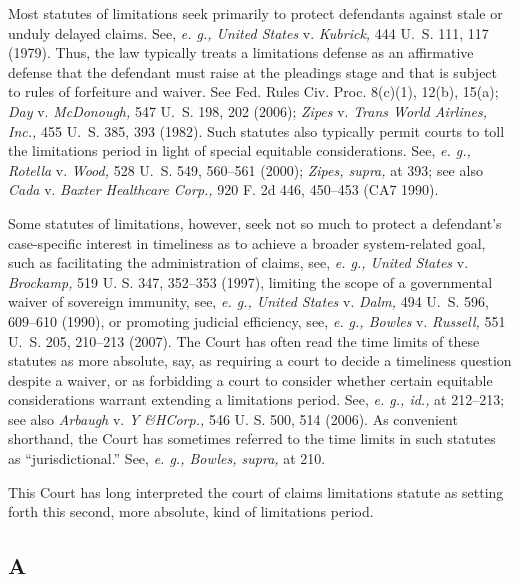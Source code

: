   Most statutes of limitations seek primarily to protect defendants against stale or unduly delayed claims. See, \emph{e. g., United States} v. \emph{Kubrick,} 444 U.~S. 111, 117 (1979). Thus, the law typically treats a limitations defense as an affirmative defense that the defendant must raise at the pleadings stage and that is subject to rules of forfeiture and waiver. See Fed. Rules Civ. Proc. 8(c)(1), 12(b), 15(a); \emph{Day} v. \emph{McDonough,} 547 U.~S. 198, 202 (2006); \emph{Zipes} v. \emph{Trans World Airlines, Inc.,} 455 U.~S. 385, 393 (1982). Such statutes also typically permit courts to toll the limitations period in light of special equitable considerations. See, \emph{e. g., Rotella} v. \emph{Wood,} 528 U.~S. 549, 560--561 (2000); \emph{Zipes, supra,} at 393; see also \emph{Cada} v. \emph{Baxter Healthcare Corp.,} 920 F. 2d 446, 450--453 (CA7 1990).

  Some statutes of limitations, however, seek not so much to protect a defendant's case-specific interest in timeliness as to achieve a broader system-related goal, such as facilitating the administration of claims, see, \emph{e. g., United States} v. \emph{Brockamp,} 519 U. S. 347, 352--353 (1997), limiting the scope of a governmental waiver of sovereign immunity, see, \emph{e. g., United States} v. \emph{Dalm,} 494 U.~S. 596, 609--610 (1990), or promoting judicial efficiency, see, \emph{e. g., Bowles} v. \emph{Russell,} 551 U.~S. 205, 210--213 (2007). The Court has often read the time limits of these statutes as more absolute, say, as requir\newpage ing a court to decide a timeliness question despite a waiver, or as forbidding a court to consider whether certain equitable considerations warrant extending a limitations period. See, \emph{e. g., id.,} at 212--213; see also \emph{Arbaugh} v. \emph{Y \&HCorp.,} 546 U. S. 500, 514 (2006). As convenient shorthand, the Court has sometimes referred to the time limits in such statutes as ``jurisdictional.'' See, \emph{e. g., Bowles, supra,} at 210.

  This Court has long interpreted the court of claims limitations statute as setting forth this second, more absolute, kind of limitations period.

\subsection{A}

